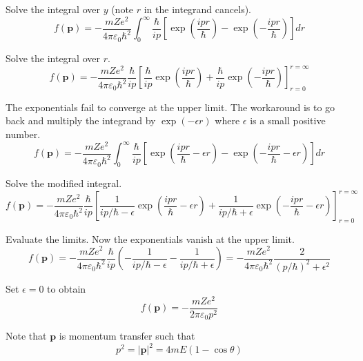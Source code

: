 Solve the integral over $y$ (note $r$ in the integrand cancels).
\begin{equation*}
f(\mathbf p)=-\frac{mZe^2}{4\pi\varepsilon_0\hbar^2}
\int_0^\infty
\frac{\hbar}{ip}
\left[\exp\left(\frac{ipr}{\hbar}\right)-\exp\left(-\frac{ipr}{\hbar}\right)\right]
dr
\end{equation*}

Solve the integral over $r$.
\begin{equation*}
f(\mathbf p)
=-\frac{mZe^2}{4\pi\varepsilon_0\hbar^2}\frac{\hbar}{ip}
\left[
\frac{\hbar}{ip}
\exp\left(\frac{ipr}{\hbar}\right)
+\frac{\hbar}{ip}
\exp\left(-\frac{ipr}{\hbar}\right)
\right]_{r=0}^{r=\infty}
\end{equation*}

The exponentials fail to converge at the upper limit.
The workaround is to go back and multiply the integrand by $\exp(-\epsilon r)$
where $\epsilon$ is a small positive number.
\begin{equation*}
f(\mathbf p)=-\frac{mZe^2}{4\pi\varepsilon_0\hbar^2}
\int_0^\infty
\frac{\hbar}{ip}
\left[\exp\left(\frac{ipr}{\hbar}-\epsilon r\right)
-\exp\left(-\frac{ipr}{\hbar}-\epsilon r\right)\right]
dr
\end{equation*}

Solve the modified integral.
\begin{equation*}
f(\mathbf p)=-\frac{mZe^2}{4\pi\varepsilon_0\hbar^2}
\frac{\hbar}{ip}
\left[
\frac{1}{ip/\hbar-\epsilon}\exp\left(\frac{ipr}{\hbar}-\epsilon r\right)
+\frac{1}{ip/\hbar+\epsilon}\exp\left(-\frac{ipr}{\hbar}-\epsilon r\right)
\right]_{r=0}^{r=\infty}
\end{equation*}

Evaluate the limits. Now the exponentials vanish at the upper limit.
\begin{equation*}
f(\mathbf p)=-\frac{mZe^2}{4\pi\varepsilon_0\hbar^2}
\frac{\hbar}{ip}
\left(-\frac{1}{ip/\hbar-\epsilon}-\frac{1}{ip/\hbar+\epsilon}\right)
=-\frac{mZe^2}{4\pi\varepsilon_0\hbar^2}\frac{2}{(p/\hbar)^2+\epsilon^2}
\tag{1}
\end{equation*}

Set $\epsilon=0$ to obtain
\begin{equation*}
f(\mathbf p)=-\frac{mZe^2}{2\pi\varepsilon_0p^2}
\end{equation*}

Note that $\mathbf p$ is momentum transfer such that
\begin{equation*}
p^2=|\mathbf p|^2=4mE(1-\cos\theta)
\end{equation*}

